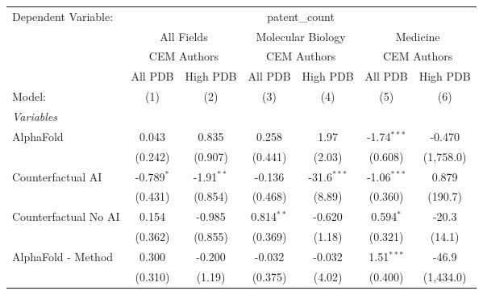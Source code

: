 \begingroup
\centering
\begin{tabular}{lcccccc}
   \tabularnewline \midrule \midrule
   Dependent Variable: & \multicolumn{6}{c}{patent\_count}\\
 & \multicolumn{2}{c}{All Fields} & \multicolumn{2}{c}{Molecular Biology} & \multicolumn{2}{c}{Medicine} \\
\cmidrule(lr){2-3} \cmidrule(lr){4-5} \cmidrule(lr){6-7}
 & \multicolumn{2}{c}{CEM Authors} & \multicolumn{2}{c}{CEM Authors} & \multicolumn{2}{c}{CEM Authors} \\
\cmidrule(lr){2-3} \cmidrule(lr){4-5} \cmidrule(lr){6-7}
 & \multicolumn{1}{c}{All PDB} & \multicolumn{1}{c}{High PDB} & \multicolumn{1}{c}{All PDB} & \multicolumn{1}{c}{High PDB} & \multicolumn{1}{c}{All PDB} & \multicolumn{1}{c}{High PDB} \\
\cmidrule(lr){2-2} \cmidrule(lr){3-3} \cmidrule(lr){4-4} \cmidrule(lr){5-5} \cmidrule(lr){6-6} \cmidrule(lr){7-7}
   Model:                                                     & (1)          & (2)           & (3)          & (4)           & (5)           & (6)\\  
   \midrule
   \emph{Variables}\\
   AlphaFold                                                  & 0.043        & 0.835         & 0.258        & 1.97          & -1.74$^{***}$ & -0.470\\   
                                                              & (0.242)      & (0.907)       & (0.441)      & (2.03)        & (0.608)       & (1,758.0)\\   
   Counterfactual AI                                          & -0.789$^{*}$ & -1.91$^{**}$  & -0.136       & -31.6$^{***}$ & -1.06$^{***}$ & 0.879\\   
                                                              & (0.431)      & (0.854)       & (0.468)      & (8.89)        & (0.360)       & (190.7)\\   
   Counterfactual No AI                                       & 0.154        & -0.985        & 0.814$^{**}$ & -0.620        & 0.594$^{*}$   & -20.3\\   
                                                              & (0.362)      & (0.855)       & (0.369)      & (1.18)        & (0.321)       & (14.1)\\   
   AlphaFold - Method                                         & 0.300        & -0.200        & -0.032       & -0.032        & 1.51$^{***}$  & -46.9\\   
                                                              & (0.310)      & (1.19)        & (0.375)      & (4.02)        & (0.400)       & (1,434.0)\\   

\end{tabular}
